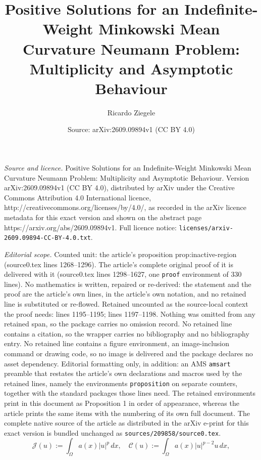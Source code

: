 \documentclass[10pt,a4paper]{amsart}
\title{Positive Solutions for an Indefinite-Weight Minkowski Mean Curvature Neumann Problem: Multiplicity and Asymptotic Behaviour}
\author{Ricardo Ziegele}
\date{Source: arXiv:2609.09894v1 (CC BY 4.0)}
\begin{document}
\maketitle

\noindent\emph{Source and licence.} Positive Solutions for an Indefinite-Weight Minkowski Mean Curvature Neumann Problem: Multiplicity and Asymptotic Behaviour. Version arXiv:2609.09894v1 (CC BY 4.0), distributed by arXiv under the Creative Commons Attribution 4.0 International licence, http://creativecommons.org/licenses/by/4.0/, as recorded in the arXiv licence metadata for this exact version and shown on the abstract page https://arxiv.org/abs/2609.09894v1. Full licence notice: \texttt{licenses/arxiv-2609.09894-CC-BY-4.0.txt}.\par\smallskip

\noindent\textit{Editorial scope.} Counted unit: the article's proposition prop:inactive-region (source0.tex lines 1268--1296). The article's complete original proof of it is delivered with it (source0.tex lines 1298--1627, one \texttt{proof} environment of 330 lines). No mathematics is written, repaired or re-derived: the statement and the proof are the article's own lines, in the article's own notation, and no retained line is substituted or re-flowed.  Retained uncounted as the source-local context the proof needs: lines 1195--1195; lines 1197--1198.  Nothing was omitted from any retained span, so the package carries no omission record.  No retained line contains a citation, so the wrapper carries no bibliography and no bibliography entry.  No retained line contains a figure environment, an image-inclusion command or drawing code, so no image is delivered and the package declares no asset dependency.  Editorial formatting only, in addition: an AMS \texttt{amsart} preamble that restates the article's own declarations and macros used by the retained lines, namely the environments \texttt{proposition} on separate counters, together with the standard packages those lines need.  The retained environments print in this document as Proposition 1 in order of appearance, whereas the article prints the same items with the numbering of its own full document.  The complete native source of the article as distributed in the arXiv e-print for this exact version is bundled unchanged as \texttt{sources/209858/source0.tex}.
\begin{equation} \label{eq:defJC} \mathcal{J}(u) := \int_\Omega a(x) |u|^{p} \, dx, \quad \mathcal{C}(u) := \int_\Omega a(x) |u|^{p-2}u \, dx,\end{equation}
\end{document}
